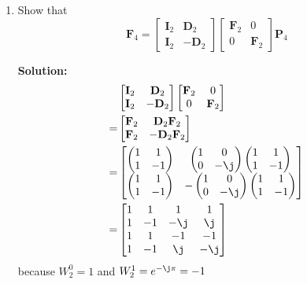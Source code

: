 \documentclass[journal,12pt,twocolumn]{IEEEtran}
\newcommand{\solution}{\noindent \textbf{Solution: }}
\let\vec\mathbf
\numberwithin{equation}{section}
\renewcommand\thesection{\arabic{section}}
\newcommand{\myvec}[1]{\ensuremath{\begin{pmatrix}#1\end{pmatrix}}}
\newcommand{\mymat}[1]{\ensuremath{\begin{bmatrix}#1\end{bmatrix}}}
\begin{document}
\begin{enumerate}[label=\thesection.\arabic*]
    \item Show that 
\begin{equation}
	\vec{F}_{4}=
\begin{bmatrix}
	\vec{I}_{2} & \vec{D}_{2} \\
\vec{I}_{2} & -\vec{D}_{2}
\end{bmatrix}
\begin{bmatrix}
\vec{F}_{2} & 0 \\
0 & \vec{F}_{2}
\end{bmatrix}
\vec{P}_{4}
\end{equation}

	\solution
	\begin{align}
		&\mymat{\vec{I}_2 & \vec{D}_2 \\ \vec{I}_2 & -\vec{D}_2} \mymat{\vec{F}_2 & 0 \\ 0 & \vec{F}_2} \\
		= &\mymat{\vec{F}_2 & \vec{D}_2\vec{F}_2 \\ \vec{F}_2 & -\vec{D}_2\vec{F}_2}  \\
		= &\mymat{\myvec{1&1\\1&-1} & \myvec{1&0\\0&-\j}\myvec{1&1\\1&-1} \\ \myvec{1&1\\1&-1} & - \myvec{1&0\\0&-\j}\myvec{1&1\\1&-1}} \\
		= &\mymat{1 & 1 & 1 & 1 \\ 1 & -1 & -\j & \j \\ 1 & 1 & -1 & -1 \\ 1 & -1 & \j & -\j}
	\end{align}		
	because $W_2^0 = 1$ and $W_2^1 = e^{-\j\pi} = -1$
	

\end{enumerate}
\end{document}
